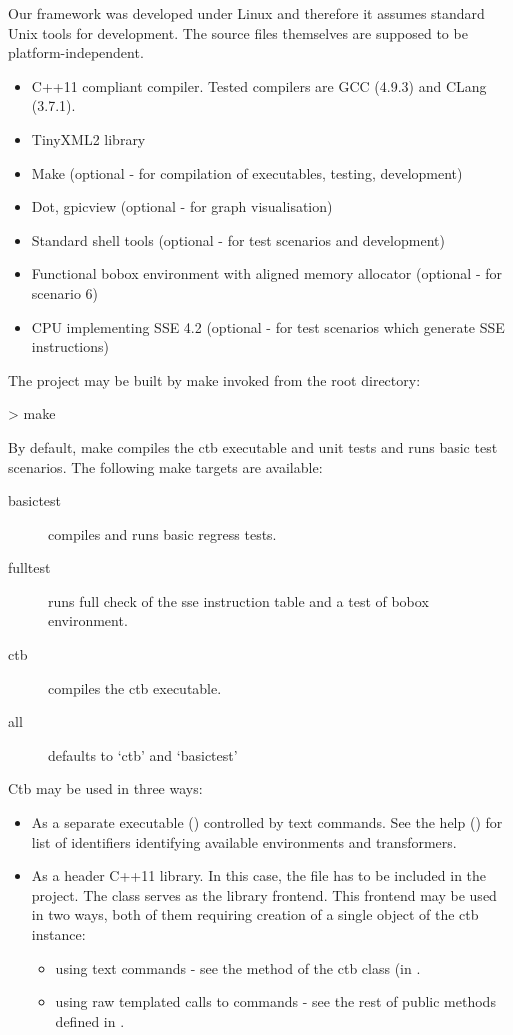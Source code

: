 Our framework was developed under Linux and therefore it assumes standard Unix tools for development. The source files themselves are supposed to be platform-independent. 

\begin{itemize}
  \item C++11 compliant compiler. Tested compilers are GCC (4.9.3) and CLang (3.7.1).
  \item TinyXML2 library 
  \item Make (optional - for compilation of executables, testing, development)
  \item Dot, gpicview (optional - for graph visualisation)
  \item Standard shell tools (optional - for test scenarios and development) 
  \item Functional bobox environment with aligned memory allocator (optional - for scenario 6)
  \item CPU implementing SSE 4.2  (optional - for test scenarios which generate SSE instructions)
\end{itemize}

The project may be built by make invoked from the root directory:
\begin{code}
> make
\end{code}

By default, make compiles the ctb executable and unit tests and runs basic test scenarios. The following make targets are available:

\begin{description}
  \item[basictest] compiles and runs basic regress tests.
  \item[fulltest] runs full check of the sse instruction table and a test of bobox environment.
  \item[ctb] compiles the ctb executable.
  \item[all] defaults to `ctb' and `basictest'
\end{description}


Ctb may be used in three ways:
\begin{itemize}
  \item As a separate executable () controlled by text commands. See the help () for list of identifiers identifying available environments and transformers.
  \item As a header C++11 library. In this case, the  file has to be included in the project. The  class serves as the library frontend. This frontend may be used in two ways, both of them requiring creation of a single object of the ctb instance:
  \begin{itemize}
    \item using text commands - see the  method of the ctb class (in .
    \item using raw templated calls to commands - see the rest of public methods defined in .
  \end{itemize}
\end{itemize}

